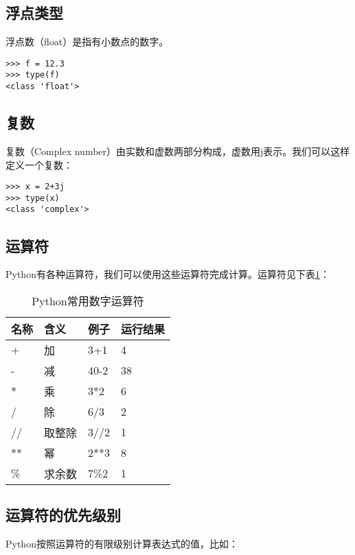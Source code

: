 \subsection{浮点类型}

浮点数（float）是指有小数点的数字。

\begin{lstlisting}
>>> f = 12.3
>>> type(f)
<class 'float'>
\end{lstlisting}

\subsection{复数}

复数（Complex number）由实数和虚数两部分构成，虚数用j表示。我们可以这样定义一个复数：

\begin{lstlisting}
>>> x = 2+3j
>>> type(x)
<class 'complex'>
\end{lstlisting}

\subsection{运算符}

Python有各种运算符，我们可以使用这些运算符完成计算。运算符见下表\ref{tab:数字运算符}：

\begin{table}[htbp]
  \centering
  \caption{Python常用数字运算符}
    \begin{tabular}{llll}
    \toprule
    名称      & 含义      & 例子      & 运行结果 \\
    \midrule
    +       & 加       & 3+1     & 4 \\
    -       & 减       & 40-2    & 38 \\
    $*$       & 乘       & 3*2     & 6 \\
    /       & 除       & 6/3     & 2 \\
    //      & 取整除     & 3//2    & 1 \\
    **      & 幂       & 2**3    & 8 \\
    \%      & 求余数     & 7\%2    & 1 \\
    \bottomrule
    \end{tabular}%
  \label{tab:数字运算符}%
\end{table}%

\subsection{运算符的优先级别}
Python按照运算符的有限级别计算表达式的值，比如：

